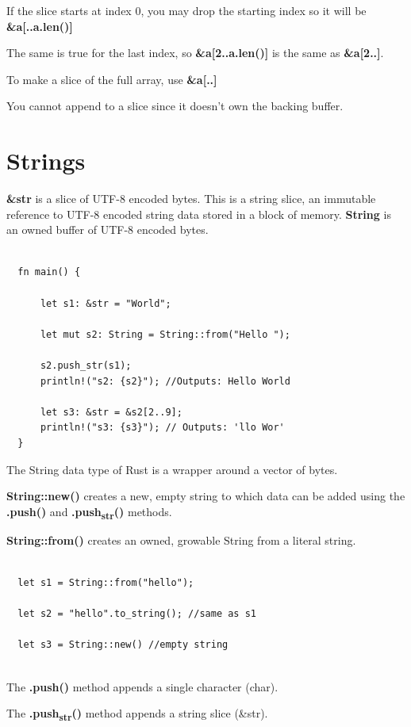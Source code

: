 \documentclass[11pt]{article}
\begin{document}
If the slice starts at index 0, you may drop the starting index so it will be \textbf{\&a[..a.len()]}

The same is true for the last index, so \textbf{\&a[2..a.len()]} is the same as \textbf{\&a[2..]}.

To make a slice of the full array, use \textbf{\&a[..]}

You cannot append to a slice since it doesn't own the backing buffer.
\section{Strings}
\label{sec:orga5c0235}

\textbf{\&str} is a slice of UTF-8 encoded bytes. This is a string slice, an immutable reference to UTF-8 encoded string data stored in a block of memory.
\textbf{String} is an owned buffer of UTF-8 encoded bytes.

\begin{verbatim}

  fn main() {

      let s1: &str = "World";

      let mut s2: String = String::from("Hello ");
 
      s2.push_str(s1);
      println!("s2: {s2}"); //Outputs: Hello World

      let s3: &str = &s2[2..9];
      println!("s3: {s3}"); // Outputs: 'llo Wor'
  }

\end{verbatim}

The String data type of Rust is a wrapper around a vector of bytes.

\textbf{String::new()} creates a new, empty string to which data can be added using the \textbf{.push()} and \textbf{.push\textsubscript{str}()} methods.

\textbf{String::from()} creates an owned, growable String from a literal string.

\begin{verbatim}

  let s1 = String::from("hello");

  let s2 = "hello".to_string(); //same as s1
  
  let s3 = String::new() //empty string
      
\end{verbatim}

The \textbf{.push()} method appends a single character (char).

The \textbf{.push\textsubscript{str}()} method appends a string slice (\&str).
\end{document}
